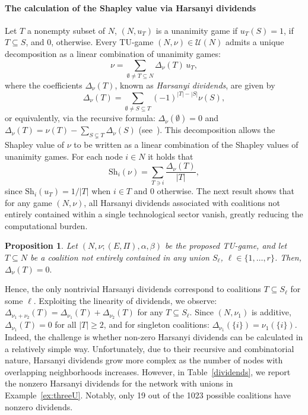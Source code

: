 \documentclass[preprint,11pt,authoryear]{elsarticle}
\theoremstyle{plain}
\newtheorem{proposition}[theorem]{Proposition}
\begin{document}
\paragraph{The  calculation of the Shapley value via Harsanyi dividends}
Let $T$ a nonempty subset of $N$, $(N,u_T)$ is a unanimity game if $u_T(S)=1$, if $T\subseteq S$, and $0$, otherwise. Every TU-game $(N, \nu) \in \mathcal{U}(N)$ admits a unique decomposition as a linear combination of unanimity games:
\[
\nu = \sum_{\emptyset \neq T \subseteq N} \Delta_{\nu}(T)\, u_T,
\]
where the coefficients $\Delta_{\nu}(T)$, known as \emph{Harsanyi dividends}, are given by
\[
\Delta_{\nu}(T) = \sum_{\emptyset \neq S \subseteq T} (-1)^{|T| - |S|} \nu(S),
\]
or equivalently, via the recursive formula: $\Delta_{\nu}(\emptyset) = 0$ and $\Delta_{\nu}(T) = \nu(T) - \sum_{S \subsetneq T} \Delta_{\nu}(S)$ (see~\citep{shapley1953b}).
This decomposition allows the Shapley value of $\nu$ to be written as a linear combination of the Shapley values of unanimity games. For each node $i \in N$ it holds that
\[
\mathrm{Sh}_i(\nu) = \sum_{T \ni i} \frac{\Delta_{\nu}(T)}{|T|},
\]
since $\mathrm{Sh}_i(u_T) = 1/|T|$ when $i \in T$ and $0$ otherwise.
The next result shows that for any game \( (N, \nu) \), all Harsanyi dividends associated with coalitions not entirely contained within a single technological sector vanish, greatly reducing the computational burden.
\begin{proposition}
\label{prop9}
Let \( (N, \nu; (E, \Pi), \alpha, \beta) \) be the proposed TU-game, and let \( T \subseteq N \) be a coalition not entirely contained in any union \( S_\ell \), \( \ell \in \{1, \ldots, r\} \). Then,
$
\Delta_{\nu}(T) = 0.
$
\end{proposition}
Hence, the only nontrivial Harsanyi dividends correspond to coalitions \( T \subseteq S_\ell \) for some \( \ell \). Exploiting the linearity of dividends, we observe:
$
\Delta_{\nu_1 + \nu_2}(T) = \Delta_{\nu_1}(T) + \Delta_{\nu_2}(T)$ for any $T \subseteq S_\ell.
$
Since \( (N, \nu_1) \) is additive, \( \Delta_{\nu_1}(T) = 0 \) for all \( |T| \geq 2 \), and for singleton coalitions:
$
\Delta_{\nu_1}(\{i\}) = \nu_1(\{i\}).$
Indeed, the challenge is whether non-zero Harsanyi dividends can be calculated in  a relatively simple way.
Unfortunately, due to their recursive and combinatorial nature, Harsanyi dividends grow more complex as the number of nodes with overlapping neighborhoods increases. 
However, in Table~\ref{dividends}, we report the nonzero Harsanyi dividends for the network with unions in Example~\ref{ex:threeU}. Notably, only 19 out of the 1023 possible coalitions have nonzero dividends.
\end{document}
